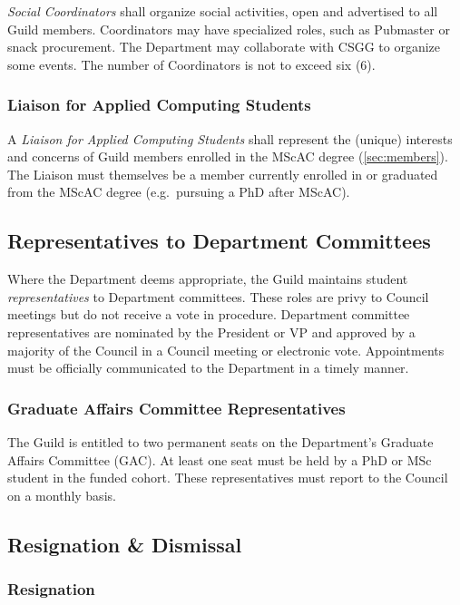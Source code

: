 \textit{Social Coordinators} shall organize social activities, open and advertised to all Guild members. Coordinators may have specialized roles, such as Pubmaster or snack procurement. The Department may collaborate with CSGG to organize some events. The number of Coordinators is not to exceed six ($6$).

\subsubsection{Liaison for Applied Computing Students}

A \textit{Liaison for Applied Computing Students} shall represent the (unique)
interests and concerns of Guild members enrolled in the MScAC degree
(\ref{sec:members}). The Liaison must themselves be a member currently enrolled
in or graduated from the MScAC degree (e.g.\ pursuing a PhD after MScAC).

\subsection{Representatives to Department Committees}\label{sec:representatives}

Where the Department deems appropriate, the Guild maintains student
\textit{representatives} to Department committees. These roles are privy to
Council meetings but do not receive a vote in procedure. Department committee
representatives are nominated by the President or VP and approved by a majority
of the Council in a Council meeting or electronic vote. Appointments must be
officially communicated to the Department in a timely manner.

\subsubsection{Graduate Affairs Committee Representatives}

The Guild is entitled to two permanent seats on the Department's Graduate
Affairs Committee (GAC). At least one seat must be held by a PhD or MSc student
in the funded cohort. These representatives must report to the Council on a
monthly basis.

\subsection{Resignation \& Dismissal}

\subsubsection{Resignation}

